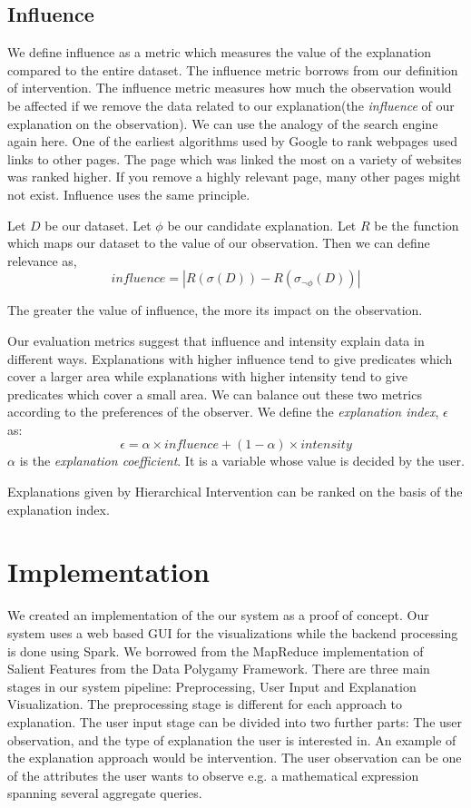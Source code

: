 \subsection{Influence}
\label{sec:influence}
We define influence as a metric which measures the value of the explanation compared to the entire dataset. The influence metric borrows from our definition of intervention. The influence metric measures how much the observation would be affected if we remove the data related to our explanation(the \textit{influence} of our explanation on the observation). We can use the analogy of the search engine again here. One of the earliest algorithms used by Google to rank webpages used links to other pages\citep{brin1998anatomy}. The page which was linked the most on a variety of websites was ranked higher. If you remove a highly relevant page, many other pages might not exist. Influence uses the same principle.

Let $D$ be our dataset. Let $\phi$ be our candidate explanation. Let $R$ be the function which maps our dataset to the value of our observation. Then we can define relevance as,
$$influence = |R(\sigma(D)) - R(\sigma_{\neg \phi} (D)) |$$

The greater the value of influence, the more its impact on the observation.

Our evaluation metrics suggest that influence and intensity explain data in different ways. Explanations with higher influence tend to give predicates which cover a larger area while explanations with higher intensity tend to give predicates which cover a small area. We can balance out these two metrics according to the preferences of the observer. We define the \textit{explanation index}, $\epsilon$ as:
$$\epsilon = \alpha \times influence + (1-\alpha) \times intensity$$
$\alpha$ is the \textit{explanation coefficient}. It is a variable whose value is decided by the user.

Explanations given by Hierarchical Intervention can be ranked on the basis of the explanation index.


\section{Implementation}
\label{sec:implementation}
We created an implementation of the our system as a proof of concept. Our system uses a web based GUI for the visualizations while the backend processing is done using Spark\citep{shanahan2015large}. We borrowed from the MapReduce implementation of Salient Features from the Data Polygamy Framework\citep{chirigati2016data}. There are three main stages in our system pipeline: Preprocessing, User Input and Explanation Visualization. The preprocessing stage is different for each approach to explanation. The user input stage can be divided into two further parts: The user observation, and the type of explanation the user is interested in. An example of the explanation approach would be intervention. The user observation can be one of the attributes the user wants to observe e.g. a mathematical expression spanning several aggregate queries.


